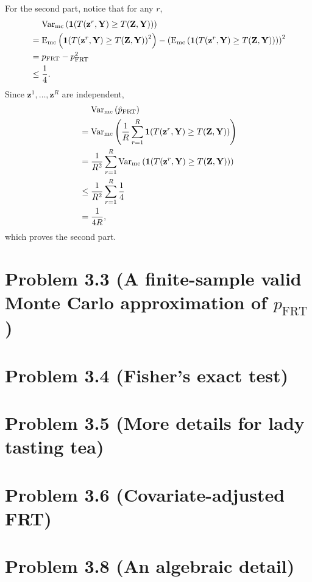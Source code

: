 \documentclass[10pt]{article}
\begin{document}
For the second part,
notice that for any $r$,
\begin{align*}
  &\mathrel{\phantom{=}}\operatorname{Var}_{\text{mc}}{\left( \mathbf{1}{\left( T{\left( \mathbf{z}^{r}, \mathbf{Y} \right)} \geq T{\left( \mathbf{Z}, \mathbf{Y} \right)} \right)} \right)} \\
  &= \operatorname{E}_{\text{mc}}{\left( \mathbf{1}{\left( T{\left( \mathbf{z}^{r}, \mathbf{Y} \right)} \geq T{\left( \mathbf{Z}, \mathbf{Y} \right)} \right)}^2 \right)}
    - {\left( \operatorname{E}_{\text{mc}}{\left( \mathbf{1}{\left( T{\left( \mathbf{z}^{r}, \mathbf{Y} \right)} \geq T{\left( \mathbf{Z}, \mathbf{Y} \right)} \right)} \right)} \right)}^2 \\
  &= p_{\mathrm{FRT}} - p_{\mathrm{FRT}}^2 \\
  &\leq \frac{1}{4}.
\end{align*}
Since $\mathbf{z}^1, \ldots, \mathbf{z}^R$ are independent,
\begin{align*}
  &\mathrel{\phantom{=}}\operatorname{Var}_{\text{mc}}{\left( \hat{p}_{\mathrm{FRT}} \right)} \\
  &= \operatorname{Var}_{\text{mc}}{\left( \frac{1}{R} \sum_{r=1}^R
  \mathbf{1}{\left( T{\left( \mathbf{z}^{r}, \mathbf{Y} \right)} \geq T{\left( \mathbf{Z}, \mathbf{Y} \right)} \right)} \right)} \\
  &= \frac{1}{R^2} \sum_{r=1}^R 
  \operatorname{Var}_{\text{mc}}{\left( \mathbf{1}{\left( T{\left( \mathbf{z}^{r}, \mathbf{Y} \right)} \geq T{\left( \mathbf{Z}, \mathbf{Y} \right)} \right)} \right)} \\
  &\leq \frac{1}{R^2} \sum_{r=1}^R \frac{1}{4} \\
  &= \frac{1}{4R},
\end{align*}
which proves the second part.

\section*{Problem 3.3 (A finite-sample valid Monte Carlo approximation of $p_{\mathrm{FRT}}$)}

\section*{Problem 3.4 (Fisher's exact test)}

\section*{Problem 3.5 (More details for lady tasting tea)}

\section*{Problem 3.6 (Covariate-adjusted FRT)}

\section*{Problem 3.8 (An algebraic detail)}
\end{document}
